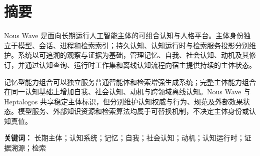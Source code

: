 \chapter*{摘要}

Nous Wave 是面向长期运行人工智能主体的可组合认知与人格平台。主体身份独立于模型、会话、进程和检索索引；持久认知、认知运行时与检索服务投影分别维护。系统以可追溯的观察与证据为基础，管理记忆、自我、社会认知、动机及其修订，并通过认知查询、运行时工作集和离线认知流程向宿主提供持续的主体状态。

记忆型能力组合可以独立服务普通智能体和检索增强生成系统；完整主体能力组合在同一认知基础上增加自我、社会认知、动机与跨领域离线认知。Nous Wave 与 Heptalogos 共享稳定主体标识，但分别维护认知权威与行为、规范及外部效果状态。模型服务、外部知识资源和检索算法均属于可替换机制，不决定主体身份或认知真值。

\textbf{关键词：} 长期主体；认知系统；记忆；自我；社会认知；动机；认知运行时；证据溯源；检索
\clearpage
